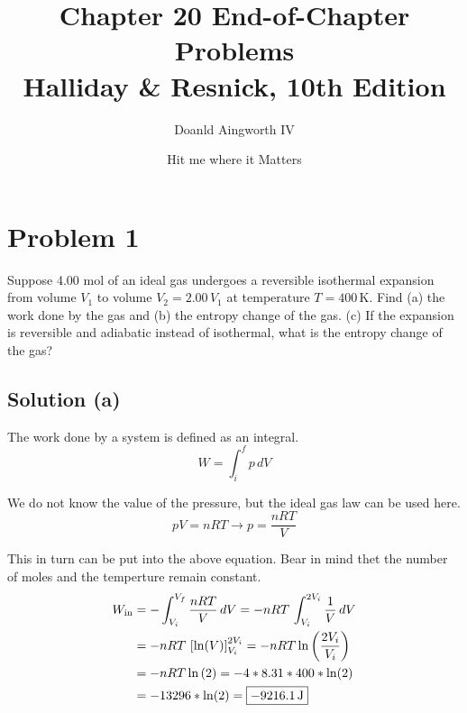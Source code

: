 \documentclass[12pt]{article}
\title{
    Chapter 20 End-of-Chapter Problems
    \\ \small
    Halliday \& Resnick, 10th Edition
}
\author{Doanld Aingworth IV}
\date{\small Hit me where it Matters}
\begin{document}

    \maketitle

    \pagebreak
    \section{Problem 1}
        Suppose 4.00 mol of an ideal gas undergoes a reversible isothermal expansion from volume $V_1$ to volume $V_2 = 2.00\,V_1$ at temperature $T = 400\,\unit{\kelvin}$. 
        Find (a) the work done by the gas and (b) the entropy change of the gas. 
        (c) If the expansion is reversible and adiabatic instead of isothermal, what is the entropy change of the gas?

        \subsection{Solution (a)}
            The work done by a system is defined as an integral.
            \begin{equation}
                W   =   \int_{i}^{f} p\,dV
            \end{equation}

            We do not know the value of the pressure, but the ideal gas law can be used here.
            \begin{equation}
                pV = nRT \to p = \frac{nRT}{V}
            \end{equation}

            This in turn can be put into the above equation.
            Bear in mind thet the number of moles and the temperture remain constant.
            \begin{align}
                W_{\rm in}  &=  -\int_{V_i}^{V_f} \frac{nRT}{V}\,dV
                    =   -nRT\,\int_{V_i}^{2V_i} \frac{1}{V}\,dV\\
                    &=  -nRT\,\left[ \ln(V) \right]_{V_i}^{2V_i}
                    =   -nRT\ln\left( \frac{2V_i}{V_i} \right)\\
                    &=  -nRT\ln\left( 2 \right)
                    =   -4*8.31*400*\ln(2)\\
                    &=  -13296*\ln(2)
                    =   \boxed{-9216.1\,\unit{\joule}}
            \end{align}
\end{document}

